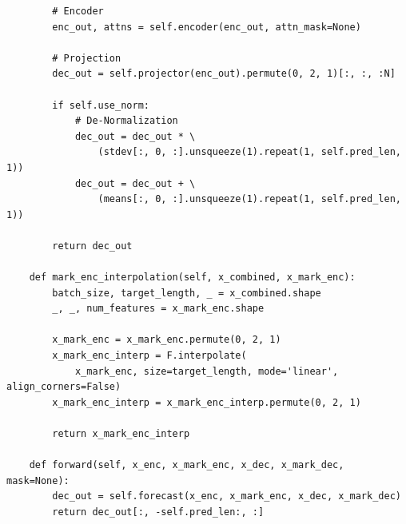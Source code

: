 \documentclass[stu,12pt,floatsintext]{apa7}
\begin{document}
\begin{verbatim}
        # Encoder
        enc_out, attns = self.encoder(enc_out, attn_mask=None)

        # Projection
        dec_out = self.projector(enc_out).permute(0, 2, 1)[:, :, :N]

        if self.use_norm:
            # De-Normalization
            dec_out = dec_out * \
                (stdev[:, 0, :].unsqueeze(1).repeat(1, self.pred_len, 1))
            dec_out = dec_out + \
                (means[:, 0, :].unsqueeze(1).repeat(1, self.pred_len, 1))

        return dec_out

    def mark_enc_interpolation(self, x_combined, x_mark_enc):
        batch_size, target_length, _ = x_combined.shape
        _, _, num_features = x_mark_enc.shape

        x_mark_enc = x_mark_enc.permute(0, 2, 1)
        x_mark_enc_interp = F.interpolate(
            x_mark_enc, size=target_length, mode='linear', align_corners=False)
        x_mark_enc_interp = x_mark_enc_interp.permute(0, 2, 1)

        return x_mark_enc_interp

    def forward(self, x_enc, x_mark_enc, x_dec, x_mark_dec, mask=None):
        dec_out = self.forecast(x_enc, x_mark_enc, x_dec, x_mark_dec)
        return dec_out[:, -self.pred_len:, :]

    
\end{verbatim}
\end{document}
